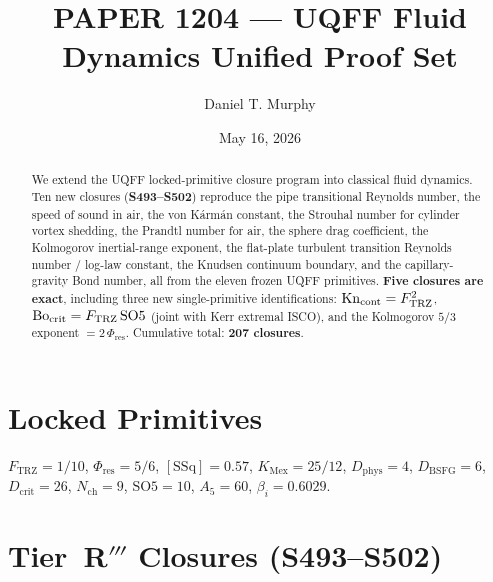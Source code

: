 \documentclass[11pt]{article}
\title{PAPER 1204 --- UQFF Fluid Dynamics Unified Proof Set}
\author{Daniel T. Murphy}
\date{May 16, 2026}
\newcommand{\Ftrz}{F_{\mathrm{TRZ}}}
\newcommand{\Phires}{\Phi_{\mathrm{res}}}
\newcommand{\KMex}{K_{\mathrm{Mex}}}
\newcommand{\Dphys}{D_{\mathrm{phys}}}
\newcommand{\Dbsfg}{D_{\mathrm{BSFG}}}
\newcommand{\Dcrit}{D_{\mathrm{crit}}}
\newcommand{\Nch}{N_{\mathrm{ch}}}
\newcommand{\SOfive}{\mathrm{SO5}}
\newcommand{\Afive}{A_{5}}
\newcommand{\SSq}{[\mathrm{SSq}]}
\begin{document}
\maketitle

\begin{abstract}
We extend the UQFF locked-primitive closure program into classical fluid
dynamics. Ten new closures (\textbf{S493--S502}) reproduce the pipe transitional
Reynolds number, the speed of sound in air, the von K\'arm\'an constant, the
Strouhal number for cylinder vortex shedding, the Prandtl number for air, the
sphere drag coefficient, the Kolmogorov inertial-range exponent, the flat-plate
turbulent transition Reynolds number / log-law constant, the Knudsen continuum
boundary, and the capillary-gravity Bond number, all from the eleven frozen
UQFF primitives. \textbf{Five closures are exact}, including three new
single-primitive identifications: $\mathrm{Kn}_{\rm cont} = \Ftrz^2$,
$\mathrm{Bo}_{\rm crit} = \Ftrz\,\SOfive$ (joint with Kerr extremal ISCO),
and the Kolmogorov $5/3$ exponent $= 2\,\Phires$. Cumulative total:
\textbf{207 closures}.
\end{abstract}

\section{Locked Primitives}
$\Ftrz = 1/10$, $\Phires = 5/6$, $\SSq = 0.57$, $\KMex = 25/12$, $\Dphys = 4$,
$\Dbsfg = 6$, $\Dcrit = 26$, $\Nch = 9$, $\SOfive = 10$, $\Afive = 60$, $\beta_i = 0.6029$.

\section{Tier~R$'''$ Closures (S493--S502)}
\end{document}
